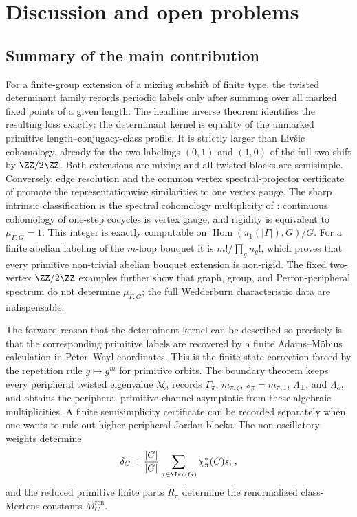 \section{Discussion and open problems}\label{sec:conclusion}

\subsection{Summary of the main contribution}

For a finite-group extension of a mixing subshift of finite type, the
twisted determinant family records periodic labels only after summing over
all marked fixed points of a given length.  The headline inverse theorem
identifies the resulting loss exactly: the determinant kernel is equality of
the unmarked primitive length--conjugacy-class profile.  It is strictly larger
than Liv\v{s}ic cohomology, already for the two labelings \((0,1)\) and
\((1,0)\) of the full two-shift by \(\ZZ/2\ZZ\).  Both extensions are mixing
and all twisted blocks are semisimple.  Conversely, edge resolution and the
common vertex spectral-projector certificate of
 promote the representationwise
similarities to one vertex gauge.  The sharp intrinsic classification is the
spectral cohomology multiplicity of
: continuous cohomology of
one-step cocycles is vertex gauge, and rigidity is equivalent to
\(\mu_{\Gamma,G}=1\).  This integer is exactly computable on
\(\operatorname{Hom}(\pi_1(|\Gamma|),G)/G\).  For a finite abelian labeling
of the \(m\)-loop bouquet it is \(m!/\prod_g n_g!\), which proves that every
primitive non-trivial abelian bouquet extension is non-rigid.  The fixed
two-vertex \(\ZZ/2\ZZ\) examples further show that graph, group, and
Perron-peripheral spectrum do not determine \(\mu_{\Gamma,G}\); the full
Wedderburn characteristic data are indispensable.

The forward reason that the determinant kernel can be described so precisely
is that the corresponding primitive labels are recovered by a finite
Adams--M\"obius calculation in Peter--Weyl coordinates. This is
the finite-state correction forced by the repetition rule
\(g\mapsto g^m\) for primitive orbits.  The boundary theorem keeps every
peripheral twisted eigenvalue \(\lambda\zeta\), records
\(\Gamma_\pi\), \(m_{\pi,\zeta}\), \(s_\pi=m_{\pi,1}\),
\(\Lambda_\perp\), and \(\Lambda_\partial\), and obtains the peripheral
primitive-channel asymptotic from these algebraic multiplicities.  A finite
semisimplicity certificate can be recorded separately when one wants to rule
out higher peripheral Jordan blocks.  The non-oscillatory weights determine
\[
  \delta_C=
  \frac{|C|}{|G|}
    \sum_{\pi\in\Irr(G)}\chi_\pi^\ast(C)s_\pi,
\]
and the reduced primitive finite parts \(R_\pi\) determine the renormalized
class-Mertens constants \(M_C^{\mathrm{ren}}\).

